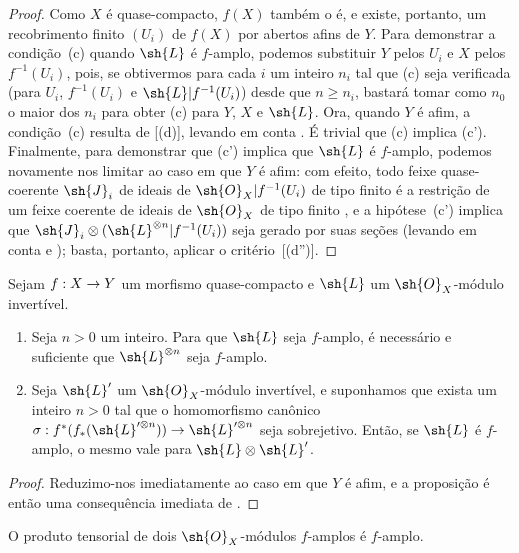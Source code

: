 \documentclass[oneside,10pt]{amsart}
\makeatletter
\renewcommand{\geq}{\geqslant}
\newcommand{\ega@arrow}[2]{\mathchoice{#1}{#2}{#2}{#2}}
\renewcommand{\to}{\ega@arrow{\longrightarrow}{\rightarrow}}
\newcommand{\oldpage}[2][]{\marginnote{\normalfont\footnotesize\textbf{#1}~|~#2}\ignorespaces}
\let\EGAOriginalLabel\label
\renewcommand{\label}[1]{\phantomsection\EGAOriginalLabel{#1}}
\makeatother
\begin{document}
\begin{proof}
Como $X$ é quase-compacto, $f(X)$ também o é, e existe, portanto, um recobrimento finito $(U_i)$ de $f(X)$ por abertos afins de $Y$.
Para demonstrar a condição~(c) quando $\sh{L}$ é $f$-amplo, podemos substituir $Y$ pelos $U_i$ e $X$ pelos $f^{-1}(U_i)$, pois, se obtivermos para cada $i$ um inteiro $n_i$ tal que (c) seja verificada (para $U_i$, $f^{-1}(U_i)$ e $\sh{L}|f^{-1}(U_i)$) desde que $n\geq n_i$, bastará tomar como $n_0$ o maior dos $n_i$ para obter (c) para $Y$, $X$ e $\sh{L}$.
Ora, quando $Y$ é afim, a condição~(c) resulta de [(d)], levando em conta .
É trivial que (c) implica (c').
Finalmente, para demonstrar que (c') implica que $\sh{L}$ é $f$-amplo, podemos novamente nos limitar ao caso em que $Y$ é afim:
com efeito, todo feixe quase-coerente $\sh{J}_i$ de ideais de $\sh{O}_X|f^{-1}(U_i)$ de tipo finito é a restrição de um feixe coerente de ideais de $\sh{O}_X$ de tipo finito , e a hipótese~(c') implica que
\oldpage[II]{91}
$\sh{J}_i\otimes(\sh{L}^{\otimes n}|f^{-1}(U_i))$ seja gerado por suas seções (levando em conta  e );
basta, portanto, aplicar o critério~[(d'')].
\end{proof}

\begin{proposition}[4.6.9]
\label{II.4.6.9}
Sejam $f:X\to Y$ um morfismo quase-compacto e $\sh{L}$ um $\sh{O}_X$-módulo invertível.
\begin{enumerate}
  \item[\rm{(i)}] Seja $n>0$ um inteiro.
    Para que $\sh{L}$ seja $f$-amplo, é necessário e suficiente que $\sh{L}^{\otimes n}$ seja $f$-amplo.
  \item[\rm{(ii)}] Seja $\sh{L}'$ um $\sh{O}_X$-módulo invertível, e suponhamos que exista um inteiro $n>0$ tal que o homomorfismo canônico $\sigma:f^*(f_*(\sh{L}'^{\otimes n}))\to\sh{L}'^{\otimes n}$ seja sobrejetivo.
    Então, se $\sh{L}$ é $f$-amplo, o mesmo vale para $\sh{L}\otimes\sh{L}'$.
\end{enumerate}
\end{proposition}

\begin{proof}
Reduzimo-nos imediatamente ao caso em que $Y$ é afim, e a proposição é então uma consequência imediata de .
\end{proof}

\begin{corollary}[4.6.10]
\label{II.4.6.10}
O produto tensorial de dois $\sh{O}_X$-módulos $f$-amplos é $f$-amplo.
\end{corollary}
\end{document}
